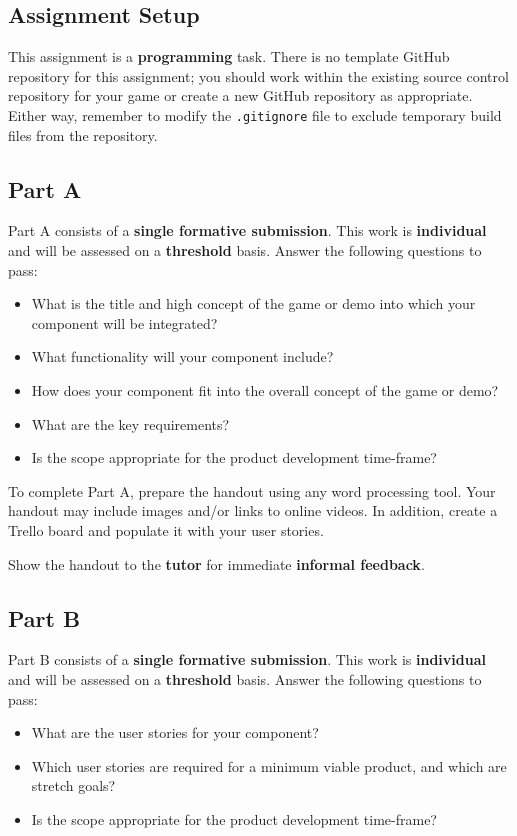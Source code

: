 \documentclass{../../fal_assignment}
\begin{document}
\subsection*{Assignment Setup}

This assignment is a \textbf{programming} task.
There is no template GitHub repository for this assignment;
you should work within the existing source control repository for your game
or create a new GitHub repository as appropriate.
Either way, remember to modify the \texttt{.gitignore} file to exclude temporary build files
from the repository.

\subsection*{Part A}

Part A consists of a \textbf{single formative submission}. This work is \textbf{individual} and will be assessed on a \textbf{threshold} basis. Answer the following questions to pass:

\begin{itemize}
	\item What is the title and high concept of the game or demo into which your component will be integrated?
	\item What functionality will your component include?
	\item How does your component fit into the overall concept of the game or demo?
	\item What are the key requirements?
	\item Is the scope appropriate for the product development time-frame?
\end{itemize}

To complete Part A, prepare the handout using any word processing tool.
Your handout may include images and/or links to online videos.
In addition, create a Trello board and populate it with your user stories.

Show the handout to the \textbf{tutor} for immediate \textbf{informal feedback}.

\subsection*{Part B}

Part B consists of a \textbf{single formative submission}. This work is \textbf{individual} and will be assessed on a \textbf{threshold} basis. Answer the following questions to pass:

\begin{itemize}
	\item What are the user stories for your component?
	\item Which user stories are required for a minimum viable product, and which are stretch goals?
	\item Is the scope appropriate for the product development time-frame?
\end{itemize}
\end{document}
